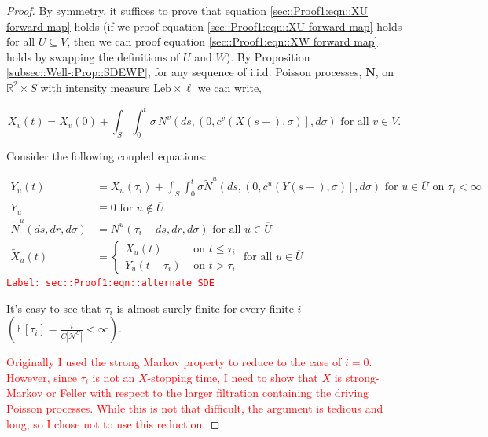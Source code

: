 \documentclass[12pt]{article}
\newcommand{\mb}{\mathbb}
\newcommand{\mc}{\mathcal}
\newcommand{\ov}{\overline}
\newcommand{\te}{\text}
\newcommand{\tr}{\textcolor{red}}
\newcommand{\labe}[1]{\tr{\texttt{Label: #1}}}
\newcommand{\ind}{\hspace{24pt}}
\newcommand{\ex}[1]{\mb{E}\left[#1\right]}			%
\renewcommand{\v}{v}							%
\newcommand{\vv}{u}								%
\renewcommand{\U}{U}							%
\newcommand{\UU}{W}								%
\renewcommand{\S}{S}							%
\newcommand{\s}{\sigma}							%
\renewcommand{\t}{t}							%
\renewcommand{\tt}{s}							%
\newcommand{\X}{X}								%
\newcommand{\IGr}{c}							%
\newcommand{\neigh}{\mc{N}}						%
\newcommand{\vind}[1]{^{#1}}					%
\newcommand{\cind}[1]{_{#1}}					%
\newcommand{\cl}{\ov}							%
\newcommand{\tp}[1]{(#1)}						%
\newcommand{\const}{C}							%
\newcommand{\poisses}{\mathbf{N}}				%
\newcommand{\poiss}{N}							%
\newcommand{\leb}{\te{Leb}}						%
\newcommand{\Sm}{\ell}							%
\renewcommand{\r}{r}							%
\newcommand{\alt}[1]{\widetilde{#1}}			%
\newcommand{\indx}[1]{_{#1}}					%
\newcommand{\XX}{Y}								%
\newcommand{\rt}{\tau}							%
\begin{document}
\begin{proof}
By symmetry, it suffices to prove that equation \ref{sec::Proof1:eqn::XU forward map} holds (if we proof equation \eqref{sec::Proof1:eqn::XU forward map} holds for all \(\U \subseteq V\), then we can proof equation \eqref{sec::Proof1:eqn::XW forward map} holds by swapping the definitions of \(\U\) and \(\UU\)). By Proposition \ref{subsec::Well-:Prop::SDEWP}, for any sequence of i.i.d. Poisson processes, \(\poisses\), on \(\mb{R}^2\times \S\) with intensity measure \(\leb\times\Sm\) we can write,

\[\X\cind{\v}\tp{\t} = \X\cind{\v}\tp{0} + \int_\S\int_0^\t \s\,\poiss\vind{\v}\left(d\tt,\left(0,\IGr\vind{\v}(\X\tp{\tt-},\s)\right],d\s\right)\te{ for all } \v\in V.\]

Consider the following coupled equations:

\begin{align}
\XX\cind{\vv}\tp{\t} &= \X\cind{\vv}\tp{\rt\indx{i}} + \int_\S\int_0^\t \s\alt{\poiss}\vind{\vv}\left(d\tt,\left(0,\IGr\vind{\vv}(\XX\tp{\tt-},\s)\right],d\s\right)\te{ for } \vv \in \cl{\U} \te{ on } \rt\indx{i} < \infty \label{sec::Proof1:eqn::alternate SDE}\\
\XX\cind{\vv} &\equiv 0\te{ for } \vv\notin \cl{\U}\nonumber\\
\alt{\poiss}\vind{\vv}(d\tt,d\r,d\s) &= \poiss\vind{\vv}(\rt\indx{i} + d\tt,d\r,d\s) \te{ for all }\vv\in \cl{\U}\nonumber\\
\alt{\X}\cind{\vv}\tp{\t} &= \begin{cases}
\X\cind{\vv}\tp{\t} &\te{ on } \t \leq \rt\indx{i}\\
\XX\cind{\vv}\tp{\t - \rt\indx{i}} &\te{ on } \t > \rt\indx{i}
\end{cases} \te{ for all } \vv\in \cl{\U} \nonumber
\end{align}
\labe{sec::Proof1:eqn::alternate SDE}

It's easy to see that \(\rt\indx{i}\) is almost surely finite for every finite \(i\) \(\left(\ex{\rt\indx{i}} = \frac{i}{\const|\neigh\vind{\U}|} < \infty\right)\). 

\ind \tr{Originally I used the strong Markov property to reduce to the case of \(i = 0\). However, since \(\rt\indx{i}\) is not an \(\X\)-stopping time, I need to show that \(\X\) is strong-Markov or Feller with respect to the larger filtration containing the driving Poisson processes. While this is not that difficult, the argument is tedious and long, so I chose not to use this reduction.}


\end{proof}
\end{document}
